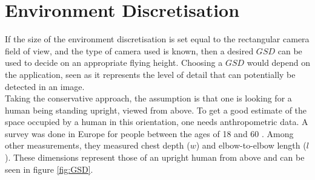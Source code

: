 \section{Environment Discretisation}
If the size of the environment discretisation is set equal to the rectangular camera field of view, and the type of camera used is known, then a desired $GSD$ can be used to decide on an appropriate flying height. Choosing a $GSD$ would depend on the application, seen as it represents the level of detail that can potentially be detected in an image.\\
Taking the conservative approach, the assumption is that one is looking for a human being standing upright, viewed from above. To get a good estimate of the space occupied by a human in this orientation, one needs anthropometric data. A survey was done in Europe for people between the ages of 18 and 60 \cite{Jurgens1998}. Among other measurements, they measured chest depth ($w$) and elbow-to-elbow length ($l$). These dimensions represent those of an upright human from above and can be seen in figure \ref{fig:GSD}.\\ 
